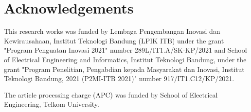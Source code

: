 \newpage
\section{Acknowledgements}
This research works was funded by Lembaga Pengembangan Inovasi dan Kewirausahaan, Institut Teknologi Bandung (LPIK ITB) under the grant "Program Penguatan Inovasi 2021" number 289L/IT1.A/SK-KP/2021 and School of Electrical Engineering and Informatics, Institut Teknologi Bandung, under the grant "Program Penelitian, Pengabdian kepada Masyarakat dan Inovasi, Institut Teknologi Bandung, 2021 (P2MI-ITB 2021)" number 917/IT1.C12/KP/2021.

The article processing charge (APC) was funded by School of Electrical Engineering, Telkom University.